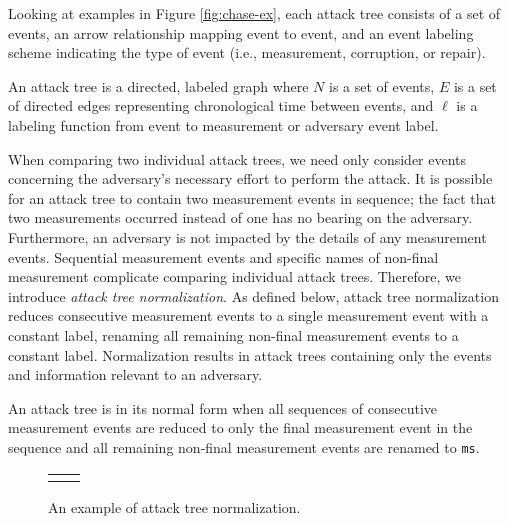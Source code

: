 \documentclass[runningheads]{llncs}
\theoremstyle{definition}
\begin{document}
\noindent Looking at examples in Figure \ref{fig:chase-ex}, each
attack tree consists of a set of events, an arrow relationship mapping
event to event, and an event labeling scheme indicating the type of
event (i.e., measurement, corruption, or repair).

\begin{definition}
    An attack tree is a directed, labeled graph where $N$ is a set of
    events, $E$ is a set of directed edges representing chronological
    time between events, and $\ell$ is a labeling function from event
    to measurement or adversary event label. 
\end{definition}

When comparing two individual attack trees, we need only consider
events concerning the adversary's necessary effort to perform the
attack. It is possible for an attack tree to contain two measurement
events in sequence; the fact that two measurements occurred instead of
one has no bearing on the adversary. Furthermore, an adversary is not
impacted by the details of any measurement events. Sequential
measurement events and specific names of non-final measurement
complicate comparing individual attack trees. Therefore, we introduce
\emph{attack tree normalization}. As defined below, attack tree normalization
reduces consecutive measurement events to a single measurement event
with a constant label, renaming all remaining non-final measurement
events to a constant label. Normalization results in attack trees
containing only the events and information relevant to an adversary.

\begin{definition}
    An attack tree is in its normal form when all sequences of
    consecutive measurement events are reduced to only the final
    measurement event in the sequence and all remaining non-final
    measurement events are renamed to \texttt{ms}.  
\end{definition}

\begin{figure}[htbp]
  \centering 
  \begin{tabular}{c c}
       &  
  \end{tabular}
  \captionsetup{justification=centering,margin=1cm}
  \caption[Example of attack tree normalization]{An example of attack tree normalization.}
  \label{fig:reduce-ex}
\end{figure}
\end{document}
